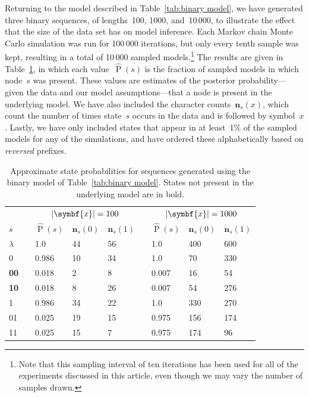 \documentclass[12pt,a4paper]{article}
\newcommand\ub[1]{\symbf{#1}}                 %
\DeclareMathOperator\Pb{P}                    %
\DeclarePairedDelimiter\abs{\lvert}{\rvert}   %
\begin{document}
Returning to the model described in Table~\ref{tab:binary model}, we have
generated three binary sequences, of lengths~100, 1000, and~10\,000, to
illustrate the effect that the size of the data set has on model inference. Each
Markov chain Monte Carlo simulation was run for 100\,000 iterations, but only
every tenth sample was kept, resulting in a total of 10\,000 sampled
models.\footnote{Note that this sampling interval of ten iterations has been
used for all of the experiments discussed in this article, even though we may
vary the number of samples drawn.} The results are given in
Table~\ref{tab:binary inference}, in which each value~\(\hat{\Pb}(s)\) is the
fraction of sampled models in which node~\(s\) was present. These values are
estimates of the posterior probability---given the data and our model
assumptions---that a node is present in the underlying model. We have also
included the character counts~\(\ub{n}_s(x)\), which count the number of times
state~\(s\) occurs in the data and is followed by symbol~\(x\). Lastly, we have
only included states that appear in at least~1\% of the sampled models for any
of the simulations, and have ordered these alphabetically based on
\emph{reversed} prefixes.
%
\begin{table}[htbp]
\centering
\begin{tabular}{lclllclll}
  \toprule
  & \quad & \multicolumn{3}{c}{\(\abs{\ub{x}} = 100\)}
  & \quad & \multicolumn{3}{c}{\(\abs{\ub{x}} = 1000\)} \\
  \cmidrule{3-5} \cmidrule{7-9}
  \(s\) && \(\hat{\Pb}(s)\) & \(\ub{n}_s(0)\) & \(\ub{n}_s(1)\)
        && \(\hat{\Pb}(s)\) & \(\ub{n}_s(0)\) & \(\ub{n}_s(1)\) \\
  \midrule
  \(\lambda\) && 1.0   & 44 & 56 && 1.0   & 400 & 600 \\
  0           && 0.986 & 10 & 34 && 1.0   & 70  & 330 \\
  \textbf{00} && 0.018 & 2  & 8  && 0.007 & 16  & 54  \\
  \textbf{10} && 0.018 & 8  & 26 && 0.007 & 54  & 276 \\
  1           && 0.986 & 34 & 22 && 1.0   & 330 & 270 \\
  01          && 0.025 & 19 & 15 && 0.975 & 156 & 174 \\
  11          && 0.025 & 15 & 7  && 0.975 & 174 & 96  \\
  \bottomrule
\end{tabular}
\caption{Approximate state probabilities for sequences generated using the
  binary model of Table~\ref{tab:binary model}. States not present in the
  underlying model are in bold.}
\label{tab:binary inference}
\end{table}
\end{document}
